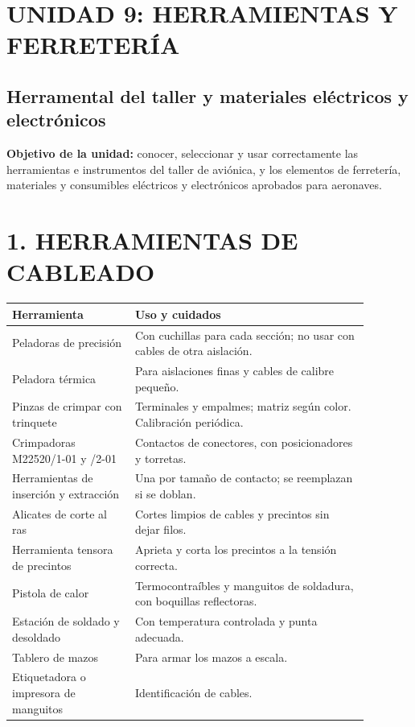 \clearpage
\section*{UNIDAD 9: HERRAMIENTAS Y FERRETERÍA}
\subsection*{Herramental del taller y materiales eléctricos y electrónicos}

\begin{recuadro}
\textbf{Objetivo de la unidad:} conocer, seleccionar y usar correctamente las herramientas e
instrumentos del taller de aviónica, y los elementos de ferretería, materiales y consumibles
eléctricos y electrónicos aprobados para aeronaves.
\end{recuadro}

\section*{1. HERRAMIENTAS DE CABLEADO}
\begin{center}
\small
\begin{tabular}{|p{0.30\linewidth}|p{0.58\linewidth}|}
\hline
\textbf{Herramienta} & \textbf{Uso y cuidados} \\ \hline
Peladoras de precisión & Con cuchillas para cada sección; no usar con cables de otra aislación. \\
\hline
Peladora térmica & Para aislaciones finas y cables de calibre pequeño. \\ \hline
Pinzas de crimpar con trinquete & Terminales y empalmes; matriz según color. Calibración
periódica. \\ \hline
Crimpadoras M22520/1-01 y /2-01 & Contactos de conectores, con posicionadores y torretas. \\
\hline
Herramientas de inserción y extracción & Una por tamaño de contacto; se reemplazan si se doblan.
\\ \hline
Alicates de corte al ras & Cortes limpios de cables y precintos sin dejar filos. \\ \hline
Herramienta tensora de precintos & Aprieta y corta los precintos a la tensión correcta. \\ \hline
Pistola de calor & Termocontraíbles y manguitos de soldadura, con boquillas reflectoras. \\ \hline
Estación de soldado y desoldado & Con temperatura controlada y punta adecuada. \\ \hline
Tablero de mazos & Para armar los mazos a escala. \\ \hline
Etiquetadora o impresora de manguitos & Identificación de cables. \\ \hline
\end{tabular}
\end{center}

